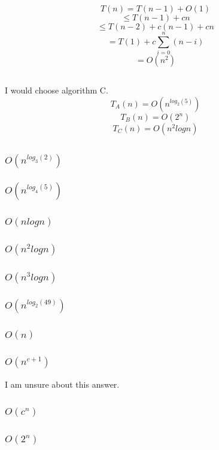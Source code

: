 \documentclass{article}
\begin{document}
\subsubsection{}
$$T(n)=T(n-1)+O(1)$$
$$\leq T(n-1) + cn$$
$$\leq T(n-2) + c(n-1) + cn$$
$$=T(1) + c \sum_{i=0}^n(n - i)$$
$$=O(n^2)$$
\subsection{}
I would choose algorithm C. 
$$T_A(n)=O(n^{log_2(5)})$$
$$T_B(n)=O(2^n)$$
$$T_C(n)=O(n^2logn)$$
\subsection{}
\subsubsection{$O(n^{log_3(2)})$}
\subsubsection{$O(n^{log_4(5)})$}
\subsubsection{$O(nlogn)$}
\subsubsection{$O(n^2logn)$}
\subsubsection{$O(n^3logn)$}
\subsubsection{$O(n^{log_2(49)})$}
\subsubsection{$O(n)$}
\subsubsection{$O(n^{c+1})$} I am unsure about this answer. 
\subsubsection{$O(c^n)$}
\subsubsection{$O(2^n)$}
\end{document}
